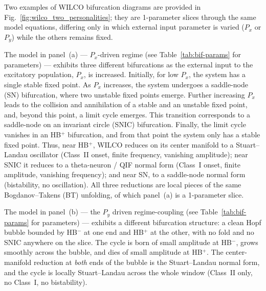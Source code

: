 \documentclass[12pt]{article}
\numberwithin{equation}{section}
\newcommand{\rev}[1]{\begingroup\color{navyblue}#1\endgroup}
\begin{document}
\rev{
Two examples of WILCO bifurcation diagrams are provided in
Fig.~\ref{fig:wilco_two_personalities}; they are 1-parameter slices
through the same model equations, differing only in which external input parameter is varied ($P_x$ or $P_y$) while the others remains fixed.

The model in panel~(a) --- $P_x$-driven regime (see Table~\ref{tab:bif-params} for parameters) --- exhibits three different
bifurcations as the external input to the excitatory population,
$P_x$, is increased. Initially, for low $P_x$, the system has a
single stable fixed point. As $P_x$ increases, the system undergoes
a saddle-node (SN) bifurcation, where two unstable fixed points
emerge. Further increasing $P_x$ leads to the collision and
annihilation of a stable and an unstable fixed point, and, beyond
this point, a limit cycle emerges. This transition corresponds to
a saddle-node on an invariant circle (SNIC) bifurcation. Finally,
the limit cycle vanishes in an HB$^+$ bifurcation, and from that
point the system only has a stable fixed point. Thus, near HB$^+$,
WILCO reduces on its center manifold to a Stuart--Landau oscillator
(Class~II onset, finite frequency, vanishing amplitude); near SNIC
it reduces to a theta-neuron / QIF normal form (Class~I onset,
finite amplitude, vanishing frequency); and near SN, to a
saddle-node normal form (bistability, no oscillation).
All three reductions are local pieces of the same
Bogdanov--Takens (BT) unfolding, of which panel~(a) is a
1-parameter slice.

The model in panel~(b) --- the $P_y$ driven regime-coupling (see Table~\ref{tab:bif-params} for parameters) --- exhibits a different bifurcation structure: a clean Hopf bubble bounded by HB$^-$ at one end and HB$^+$ at the other, with no fold and no SNIC anywhere on the slice. The cycle is born of small amplitude at HB$^-$, grows smoothly across the bubble, and dies of small amplitude at HB$^+$. The center-manifold reduction at \emph{both} ends of the bubble is the Stuart--Landau normal form, and the cycle is locally Stuart--Landau across the whole window (Class~II only, no Class~I, no bistability).

}
\end{document}
